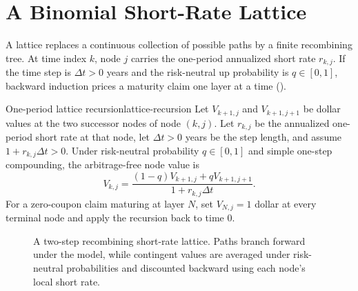 \documentclass[11pt]{article}
\begin{document}
\section{A Binomial Short-Rate Lattice}

A lattice replaces a continuous collection of possible paths by a finite recombining tree. At time index $k$, node $j$ carries the one-period annualized short rate $r_{k,j}$. If the time step is $\Delta t>0$ years and the risk-neutral up probability is $q\in[0,1]$, backward induction prices a maturity claim one layer at a time ().

\begin{proposition}{One-period lattice recursion}{lattice-recursion}
Let $V_{k+1,j}$ and $V_{k+1,j+1}$ be dollar values at the two successor nodes of node $(k,j)$. Let $r_{k,j}$ be the annualized one-period short rate at that node, let $\Delta t>0$ years be the step length, and assume $1+r_{k,j}\Delta t>0$. Under risk-neutral probability $q\in[0,1]$ and simple one-step compounding, the arbitrage-free node value is
\begin{equation}
  \label{eq:lattice-recursion}
  V_{k,j}=\frac{(1-q)V_{k+1,j}+qV_{k+1,j+1}}
  {1+r_{k,j}\Delta t}.
\end{equation}
For a zero-coupon claim maturing at layer $N$, set $V_{N,j}=1$ dollar at every terminal node and apply the recursion back to time 0.
\end{proposition}

\begin{figure}[ht]
  \centering
  \caption{A two-step recombining short-rate lattice. Paths branch forward under the model, while contingent values are averaged under risk-neutral probabilities and discounted backward using each node's local short rate.}
  \label{fig:rate-lattice}
\end{figure}
\end{document}
